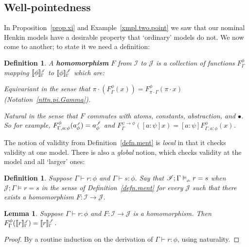 \documentclass[submission,copyright]{eptcs}
\newtheorem{lemm}[thrm]{Lemma}
\newtheorem{defn}[thrm]{Definition}
\newcommand{\deffont}[1]{\textbf{#1}}
\newcommand\fto{{\to}}
\newcommand\den[1]{{\hspace{.00ex}\scalebox{.55}{$#1$}}}
\newcommand{\idenot}[2]{\denot{\interp I}{#1}{#2}}
\newcommand{\jdenot}[2]{\denot{\interp J}{#1}{#2}}
\newcommand\interp[1]{\ensuremath{\mathscr #1}}
\newcommand{\denot}[3]{\llbracket #3 \rrbracket_{\scalebox{.6}{$#2$}}^\den{#1}} \newcommand{\hdenot}[1]{\denot{\interp H}{}{#1}}
\newcommand{\act}{{\cdot}}
\newcommand\cent{\vdash}
\newcommand\ment{\vDash}
\newcommand\gloment{\vDash_{\scalebox{.4}{glo}}}
\begin{document}
\subsection{Well-pointedness}
\label{subsect.well-pointed}


In Proposition~\ref{prop.xi} and Example~\ref{xmpl.two.point} we saw that our nominal Henkin models have a desirable property that `ordinary' models do not.
We now come to another; to state it we need a definition:
\begin{defn}
A \deffont{homomorphism} $F$ from $\interp I$ to $\interp J$ is a collection of functions $F^\phi_{\Gamma}$ mapping $\idenot{\Gamma}{\phi}$ to $\jdenot{\Gamma}{\phi}$ which are:
\begin{itemize*}
\item
\emph{Equivariant} in the sense that $\pi\act (F^\phi_{\Gamma}(x))=F^\phi_{\pi\act\Gamma}(\pi\act x)$ (Notation~\ref{nttn.pi.Gamma}).
\item
\emph{Natural} in the sense that $F$ commutes with atoms, constants, abstraction, and $\bullet$.
So for example, $F^\phi_{\Gamma,a{:}\phi}(a^\iden_\phi)=a^\jden_\phi$ and $F^{\psi\fto\phi}_{\Gamma}([a{:}\psi]x)=[a{:}\psi]F^\phi_{\Gamma,a{:}\phi}(x)$. 
\end{itemize*}
\end{defn}

The notion of validity from Definition~\ref{defn.ment} is \emph{local} in that it checks validity at one model.
There is also a \emph{global} notion, which checks validity at the model and all `larger' ones:
\begin{defn}
Suppose $\Gamma\cent r{:}\phi$ and $\Gamma\cent s{:}\phi$.
Say that $\interp I;\Gamma\gloment r=s$ when $\interp J;\Gamma\ment r=s$ in the sense of Definition~\ref{defn.ment} for every $\interp J$ such that there exists a homomorphism $F:\interp I\to\interp J$. 
\end{defn}

\begin{lemm}
\label{lemm.sub.morph.commute}
Suppose $\Gamma\cent r:\phi$ and $F:\interp I\to\interp J$ is a homomorphism.
Then 
$F^\phi_{\Gamma}(\idenot{\Gamma}{r})=\jdenot{\Gamma}{r}$.
\end{lemm}
\begin{proof}
By a routine induction on the derivation of $\Gamma\cent r:\phi$, using naturality.
\end{proof}
\end{document}
